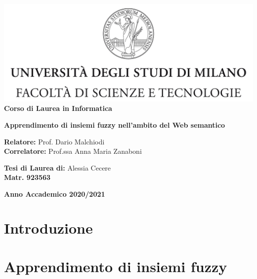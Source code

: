 \documentclass[12pt,a4paper]{report}
\begin{document}
\begin{titlepage}
\begin{center}
\includegraphics[width=\textwidth]{Logo.jpg}\\
{\large{\bf Corso di Laurea in Informatica}}
\end{center}
\vspace{12mm}
\begin{center}
{\huge{\bf Apprendimento di insiemi fuzzy nell'ambito del Web semantico}}\\
\end{center}
\vspace{12mm}
\begin{flushleft}
{\large{\bf Relatore:}}
{\large{Prof. Dario Malchiodi}}\\
\vspace{4mm}
{\large{\bf Correlatore:}}
{\large{Prof.ssa Anna Maria Zanaboni}}\\
\end{flushleft}
\vspace{12mm}
\begin{flushright}
{\large{\bf Tesi di Laurea di:}}
{\large{Alessia Cecere}}\\
{\large{\bf Matr. 923563}}\\
\end{flushright}
\vspace{4mm}
\begin{center}
{\large{\bf Anno Accademico 2020/2021}}
\end{center}
\end{titlepage}


\tableofcontents


\chapter*{Introduzione}

\chapter{Apprendimento di insiemi fuzzy}
\end{document}
